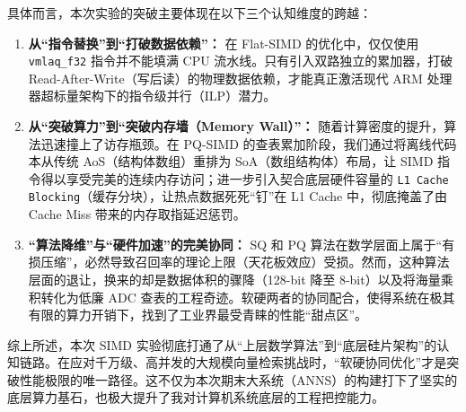 \documentclass[UTF8,a4paper,10pt]{ctexart}
\begin{document}
具体而言，本次实验的突破主要体现在以下三个认知维度的跨越：
\begin{enumerate}
    \item \textbf{从“指令替换”到“打破数据依赖”：} 在 Flat-SIMD 的优化中，仅仅使用 \texttt{vmlaq\_f32} 指令并不能填满 CPU 流水线。只有引入双路独立的累加器，打破 Read-After-Write（写后读）的物理数据依赖，才能真正激活现代 ARM 处理器超标量架构下的指令级并行（ILP）潜力。
    
    \item \textbf{从“突破算力”到“突破内存墙（Memory Wall）”：} 随着计算密度的提升，算法迅速撞上了访存瓶颈。在 PQ-SIMD 的查表累加阶段，我们通过将离线代码本从传统 AoS（结构体数组）重排为 SoA（数组结构体）布局，让 SIMD 指令得以享受完美的连续内存访问；进一步引入契合底层硬件容量的 \texttt{L1 Cache Blocking}（缓存分块），让热点数据死死“钉”在 L1 Cache 中，彻底掩盖了由 Cache Miss 带来的内存取指延迟惩罚。
    
    \item \textbf{“算法降维”与“硬件加速”的完美协同：} SQ 和 PQ 算法在数学层面上属于“有损压缩”，必然导致召回率的理论上限（天花板效应）受损。然而，这种算法层面的退让，换来的却是数据体积的骤降（128-bit 降至 8-bit）以及将海量乘积转化为低廉 ADC 查表的工程奇迹。软硬两者的协同配合，使得系统在极其有限的算力开销下，找到了工业界最受青睐的性能“甜点区”。
\end{enumerate}

综上所述，本次 SIMD 实验彻底打通了从“上层数学算法”到“底层硅片架构”的认知链路。在应对千万级、高并发的大规模向量检索挑战时，“软硬协同优化”才是突破性能极限的唯一路径。这不仅为本次期末大系统（ANNS）的构建打下了坚实的底层算力基石，也极大提升了我对计算机系统底层的工程把控能力。
\end{document}
